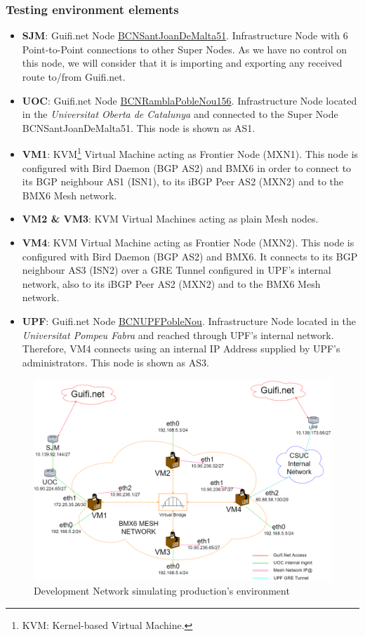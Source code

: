\subsubsection{Testing environment elements}
\begin{itemize}
    \item \textbf{SJM}: Guifi.net Node  \href{https://guifi.net/en/node/20262/}{BCNSantJoanDeMalta51}. Infrastructure Node with 6 Point-to-Point connections to other Super Nodes. As we have no control on this node, we will consider that it is importing and exporting any received route to/from Guifi.net.
    \item \textbf{UOC}: Guifi.net Node \href{https://guifi.net/en/node/63255}{BCNRamblaPobleNou156}. Infrastructure Node located in the \textit{Universitat Oberta de Catalunya} and connected to the Super Node BCNSantJoanDeMalta51. This node is shown as AS1.
    \item \textbf{VM1}: KVM\footnote{KVM: Kernel-based Virtual Machine.} Virtual Machine acting as Frontier Node (MXN1). This node is configured with Bird Daemon (BGP AS2) and BMX6 in order to connect to its BGP neighbour AS1 (ISN1), to its iBGP Peer AS2 (MXN2) and to the BMX6 Mesh network.
    \item \textbf{VM2 \& VM3}: KVM Virtual Machines acting as plain Mesh nodes.
    \item \textbf{VM4}: KVM Virtual Machine acting as Frontier Node (MXN2). This node is configured with Bird Daemon (BGP AS2) and BMX6. It connects to its BGP neighbour AS3 (ISN2) over a GRE Tunnel configured in UPF's internal network, also to its iBGP Peer AS2 (MXN2) and to the BMX6 Mesh network.
    \item \textbf{UPF}: Guifi.net Node \href{https://guifi.net/en/node/56604}{BCNUPFPobleNou}. Infrastructure Node located in the \textit{Universitat Pompeu Fabra} and reached through UPF's internal network. Therefore, VM4 connects using an internal IP Address supplied by UPF's administrators. This node is shown as AS3.
\end{itemize}


\begin{landscape}

\begin{figure}[ht!]
        \centering
        \includegraphics[width=\hsize]{images/devnetfull}
        \caption{Development Network simulating production's environment}
        \label{fig:devnet}
	\end{figure}
\end{landscape}
\newpage

